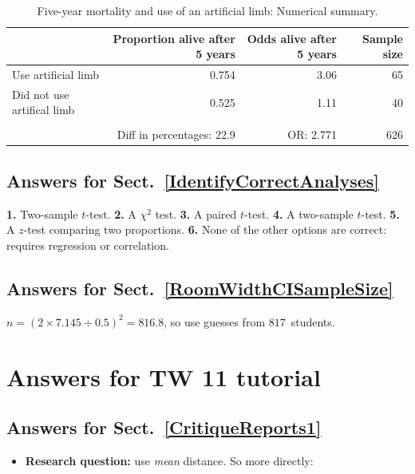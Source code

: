 \documentclass[
  11pt,
  a4paper,
  krantz2]{krantz}
\providecommand{\tightlist}{%
  \setlength{\itemsep}{0pt}\setlength{\parskip}{0pt}}
\begin{document}
\begin{footnotesize}
\begin{table}
\centering
\caption{\label{tab:ArtLimbSummaryANS}Five-year mortality and use of an artificial limb: Numerical summary.}
\centering
\fontsize{8}{10}\selectfont
\begin{tabular}[t]{lrrr}
\toprule
\textbf{ } & \textbf{Proportion alive after 5 years} & \textbf{Odds alive after 5 years} & \textbf{Sample size}\\
\midrule
Use artificial limb & 0.754 & 3.06 & 65\\
Did not use artifical limb & 0.525 & 1.11 & 40\\
\midrule\\
 & Diff in percentages: 22.9 & OR: 2.771 & 626\\
\bottomrule
\end{tabular}
\end{table}

\subsection*{Answers for Sect.~\ref{IdentifyCorrectAnalyses}}\label{answers-for-sect.-refidentifycorrectanalyses}

\textbf{1.} Two-sample \(t\)-test.
\textbf{2.} A \(\chi^2\) test.
\textbf{3.} A paired \(t\)-test.
\textbf{4.} A two-sample \(t\)-test.
\textbf{5.} A \(z\)-test comparing two proportions.
\textbf{6.} None of the other options are correct: requires regression or correlation.

\subsection*{Answers for Sect.~\ref{RoomWidthCISampleSize}}\label{answers-for-sect.-refroomwidthcisamplesize}

\(n = (2\times 7.145\div 0.5)^2 = 816.8\), so use guesses from \(817\)~students.

\section{Answers for TW 11 tutorial}\label{Lecture11Answers}

\subsection*{Answers for Sect.~\ref{CritiqueReports1}}\label{answers-for-sect.-refcritiquereports1}

\begin{itemize}
\tightlist
\item
  \textbf{Research question:} use \emph{mean} distance.
  So more directly:
\end{itemize}


\end{footnotesize}
\end{document}
